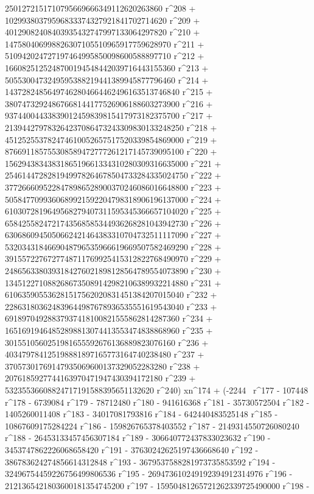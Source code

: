        2501272151710795669666349112620263860 r^208 + 
       10299380379596833374327921841702714620 r^209 + 
       40129082408403935432747997133064297820 r^210 + 
       147580406998826307105510965917759628970 r^211 + 
       510942024727197464995850098600588897710 r^212 + 
       1660825125248700194548442039716443155360 r^213 + 
       5055300473249595388219441389945877796460 r^214 + 
       14372824856497462804664462496163513746840 r^215 + 
       38074732924867668144177526906188603273900 r^216 + 
       93744004433839012459839815417973182375700 r^217 + 
       213944279783264237086473243309830133248250 r^218 + 
       451252553782474610052657517520339854869000 r^219 + 
       876691185755308589472777261217145739095100 r^220 + 
       1562943834383186519661334310280309316635000 r^221 + 
       2546144728281949978264678504733284335024750 r^222 + 
       3772666095228478986528900370246086016648800 r^223 + 
       5058477099360689921592204798318906196137000 r^224 + 
       6103072819649568279407311595345366657104020 r^225 + 
       6584255824721743568585344936268281043942730 r^226 + 
       6306860945050662421464383310704732511117090 r^227 + 
       5320343184669048796535966619669507582469290 r^228 + 
       3915572276727748711769925415312822768490970 r^229 + 
       2486563380393184276021898128564789554073890 r^230 + 
       1345122710882686735089142982106389932214880 r^231 + 
       610635905536281517562020831451384207015040 r^232 + 
       228631803624839644987678936535551619543040 r^233 + 
       69189704928837937418100821555862814287360 r^234 + 
       16516919464852898813074413553474838868960 r^235 + 
       3015510560251981655592676136889823076160 r^236 + 
       403479784125198881897165773164740238480 r^237 + 
       37057301769147935069600137329052283280 r^238 + 
       2076185927744163970471947430394172180 r^239 + 
       53235536608824717191588395651132620 r^240) xn^174 + (-2244 \
r^177 - 107448 r^178 - 6739084 r^179 - 78712480 r^180 - 
       941616368 r^181 - 35730572504 r^182 - 1405260011408 r^183 - 
       34017081793816 r^184 - 642440483525148 r^185 - 
       10867609175284224 r^186 - 159826765378403552 r^187 - 
       2149314550726080240 r^188 - 26453133457456307184 r^189 - 
       306640772437833023632 r^190 - 3453747862226068658420 r^191 - 
       37630242625197436668640 r^192 - 
       386783624274856614312848 r^193 - 
       3679537588281973735853592 r^194 - 
       32496754459226756499806536 r^195 - 
       269473610249192394912314976 r^196 - 
       2121365421803600181354745200 r^197 - 
       15950481265721262339725490000 r^198 - 
